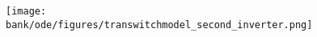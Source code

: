 \begin{figure}[H]
  \begin{center}
    \texttt{[image: \\bank/ode/figures/transwitchmodel\_second\_inverter.png]}
  \end{center}
  \label{fig:inverter1}
\end{figure}
